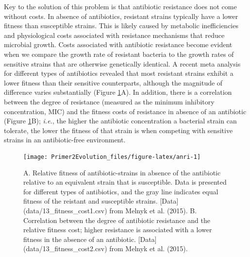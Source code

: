 \documentclass[
]{book}
\begin{document}
Key to the solution of this problem is that antibiotic resistance does not come without costs. In absence of antibiotics, resistant strains typically have a lower fitness than susceptible strains. This is likely caused by metabolic inefficiencies and physiological costs associated with resistance mechanisms that reduce microbial growth. Costs associated with antibiotic resistance become evident when we compare the growth rate of resistant bacteria to the growth rates of sensitive strains that are otherwise genetically identical. A recent meta analysis for different types of antibiotics revealed that most resistant strains exhibit a lower fitness than their sensitive counterparts, although the magnitude of difference varies substantially (Figure \ref{fig:anri}A). In addition, there is a correlation between the degree of resistance (measured as the minimum inhibitory concentration, MIC) and the fitness costs of resistance in absence of an antibiotic (Figure \ref{fig:anri}B); \emph{i.e.}, the higher the antibiotic concentration a bacterial strain can tolerate, the lower the fitness of that strain is when competing with sensitive strains in an antibiotic-free environment.

\begin{figure}
\texttt{[image: Primer2Evolution\_files/figure-latex/anri-1]} \caption{A. Relative fitness of antibiotic-strains in absence of the antibiotic relative to an equivalent strain that is susceptible. Data is presented for different types of antibiotics, and the gray line indicates equal fitness of the reistant and susceptible strains. [Data](data/13_fitness_cost1.csv) from Melnyk et al. (2015). B. Correlation between the degree of antibiotic resistance and the relative fitness cost; higher resistance is associated with a lower fitness in the absence of an antibiotic. [Data](data/13_fitness_cost2.csv) from Melnyk et al. (2015).}\label{fig:anri}
\end{figure}
\end{document}
